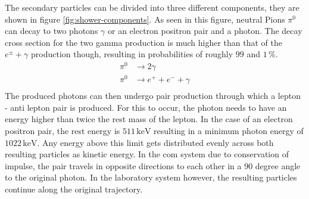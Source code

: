 \documentclass[abstract,toc,los,lof,english,10pt,glossary,acronyms]{jluthesis}
\begin{document}
The secondary particles can be divided into three different components, they are shown in figure \ref{fig:shower-components}.
As seen in this figure, neutral Pions $\pi^0$ can decay to two photons $\gamma$ or an electron positron pair and a photon. The decay cross section for the two gamma production is much higher than that of the $e^\pm + \gamma$ production though, resulting in probabilities of roughly $99$ and $1\,\%$. 
\begin{equation}
	\begin{aligned}
		\pi^0 &\rightarrow 2\gamma \\
		\pi^0 &\rightarrow e^+ + e^- + \gamma \\
	\end{aligned}
\end{equation}
The produced photons can then undergo pair production through which a lepton - anti lepton pair is produced. For this to occur, the photon needs to have an energy higher than twice the rest mass of the lepton. In the case of an electron positron pair, the rest energy is $511\,\text{keV}$ resulting in a minimum photon energy of $1022\,\text{keV}$. Any energy above this limit gets distributed evenly across both resulting particles as kinetic energy. In the \acrfull{com} system due to conservation of impulse, the pair travels in opposite directions to each other in a 90 degree angle to the original photon. In the laboratory system however, the resulting particles continue along the original trajectory.
\end{document}
